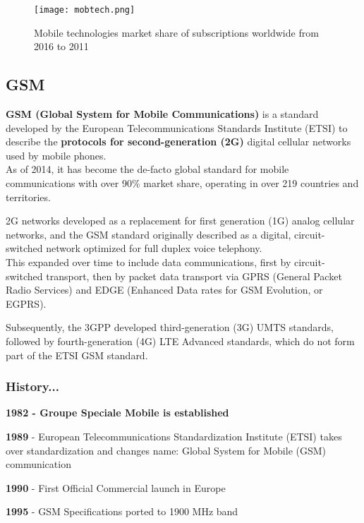\begin{figure}[H]
  \centering
  \texttt{[image: mobtech.png]}
  \caption{Mobile technologies market share of subscriptions worldwide from
  2016 to 2011}
  \label{fig:mobtech}
\end{figure}

\subsection{GSM}

\textbf{GSM (Global System for Mobile Communications)} is a standard
developed by the European Telecommunications Standards Institute (ETSI) to
describe the \textbf{protocols for second-generation (2G)} digital cellular
networks used by mobile phones. \\

As of 2014, it has become the de-facto global standard for mobile
communications with over 90\% market share, operating in over 219 countries
and territories.

2G networks developed as a replacement for first generation (1G) analog
cellular networks, and the GSM standard originally described as a digital,
circuit-switched network optimized for full duplex voice telephony. \\

This expanded over time to include data communications, first by
circuit-switched transport, then by packet data transport via GPRS
(General Packet Radio Services) and EDGE (Enhanced Data rates for GSM
Evolution, or EGPRS).

Subsequently, the 3GPP developed third-generation (3G) UMTS standards, followed
by fourth-generation (4G) LTE Advanced standards, which do not form part of the
ETSI GSM standard.

\subsubsection{History...}

\textbf{1982 - Groupe Speciale Mobile is established}

\textbf{1989} - European Telecommunications Standardization Institute
(ETSI) takes over standardization and changes name: Global System for Mobile
(GSM) communication

\textbf{1990} - First Official Commercial launch in Europe

\textbf{1995} - GSM Specifications ported to 1900 MHz band \\

